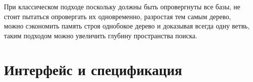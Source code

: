 При классическом подходе поскольку должны быть опровергнуты все базы, не стоит пытаться опровергать их одновременно, разростая тем самым дерево, можно сэкономить память строя однобокое дерево и доказывая всегда одну ветвь, таким подходом можно увеличить глубину пространства поиска.


\section{Интерфейс и спецификация}





